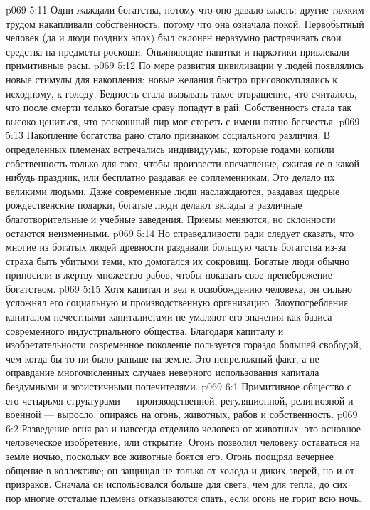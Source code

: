 \vs p069 5:11 \pc {}\bibnobreakspace {} Одни жаждали богатства, потому что оно давало власть; другие тяжким трудом накапливали собственность, потому что она означала покой. Первобытный человек (да и люди поздних эпох) был склонен неразумно растрачивать свои средства на предметы роскоши. Опьяняющие напитки и наркотики привлекали примитивные расы.
\vs p069 5:12 \pc По мере развития цивилизации у людей появлялись новые стимулы для накопления; новые желания быстро присовокуплялись к исходному, к голоду. Бедность стала вызывать такое отвращение, что считалось, что после смерти только богатые сразу попадут в рай. Собственность стала так высоко цениться, что роскошный пир мог стереть с имени пятно бесчестья.
\vs p069 5:13 Накопление богатства рано стало признаком социального различия. В определенных племенах встречались индивидуумы, которые годами копили собственность только для того, чтобы произвести впечатление, сжигая ее в какой\hyp{}нибудь праздник, или бесплатно раздавая ее соплеменникам. Это делало их великими людьми. Даже современные люди наслаждаются, раздавая щедрые рождественские подарки, богатые люди делают вклады в различные благотворительные и учебные заведения. Приемы меняются, но склонности остаются неизменными.
\vs p069 5:14 Но справедливости ради следует сказать, что многие из богатых людей древности раздавали большую часть богатства из\hyp{}за страха быть убитыми теми, кто домогался их сокровищ. Богатые люди обычно приносили в жертву множество рабов, чтобы показать свое пренебрежение богатством.
\vs p069 5:15 Хотя капитал и вел к освобождению человека, он сильно усложнял его социальную и производственную организацию. Злоупотребления капиталом нечестными капиталистами не умаляют его значения как базиса современного индустриального общества. Благодаря капиталу и изобретательности современное поколение пользуется гораздо большей свободой, чем когда бы то ни было раньше на земле. Это непреложный факт, а не оправдание многочисленных случаев неверного использования капитала бездумными и эгоистичными попечителями.
\vs p069 6:1 Примитивное общество с его четырьмя структурами --- производственной, регуляционной, религиозной и военной --- выросло, опираясь на огонь, животных, рабов и собственность.
\vs p069 6:2 Разведение огня раз и навсегда отделило человека от животных; это основное человеческое изобретение, или открытие. Огонь позволил человеку оставаться на земле ночью, поскольку все животные боятся его. Огонь поощрял вечернее общение в коллективе; он защищал не только от холода и диких зверей, но и от призраков. Сначала он использовался больше для света, чем для тепла; до сих пор многие отсталые племена отказываются спать, если огонь не горит всю ночь.
